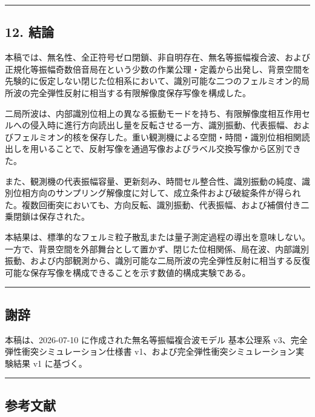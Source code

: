 \documentclass[
  a4paper,
]{article}
\begin{document}
\begin{center}\rule{0.5\linewidth}{0.5pt}\end{center}

\subsection{12. 結論}\label{ux7d50ux8ad6}

本稿では、無名性、全正符号ゼロ閉鎖、非自明存在、無名等振幅複合波、および正規化等振幅奇数倍音局在という少数の作業公理・定義から出発し、背景空間を先験的に仮定しない閉じた位相系において、識別可能な二つのフェルミオン的局所波の完全弾性反射に相当する有限解像度保存写像を構成した。

二局所波は、内部識別位相上の異なる振動モードを持ち、有限解像度相互作用セルへの侵入時に進行方向読出し量を反転させる一方、識別振動、代表振幅、およびフェルミオン的核を保存した。重い観測機による空間・時間・識別位相相関読出しを用いることで、反射写像を通過写像およびラベル交換写像から区別できた。

また、観測機の代表振幅容量、更新刻み、時間セル整合性、識別振動の純度、識別位相方向のサンプリング解像度に対して、成立条件および破綻条件が得られた。複数回衝突においても、方向反転、識別振動、代表振幅、および補償付き二乗閉鎖は保存された。

本結果は、標準的なフェルミ粒子散乱または量子測定過程の導出を意味しない。一方で、背景空間を外部舞台として置かず、閉じた位相関係、局在波、内部識別振動、および内部観測から、識別可能な二局所波の完全弾性反射に相当する反復可能な保存写像を構成できることを示す数値的構成実験である。

\begin{center}\rule{0.5\linewidth}{0.5pt}\end{center}

\subsection{謝辞}\label{ux8b1dux8f9e}

本稿は、2026-07-10 に作成された無名等振幅複合波モデル 基本公理系
v3、完全弾性衝突シミュレーション仕様書
v1、および完全弾性衝突シミュレーション実験結果 v1 に基づく。

\begin{center}\rule{0.5\linewidth}{0.5pt}\end{center}

\subsection{参考文献}\label{ux53c2ux8003ux6587ux732e}
\end{document}
